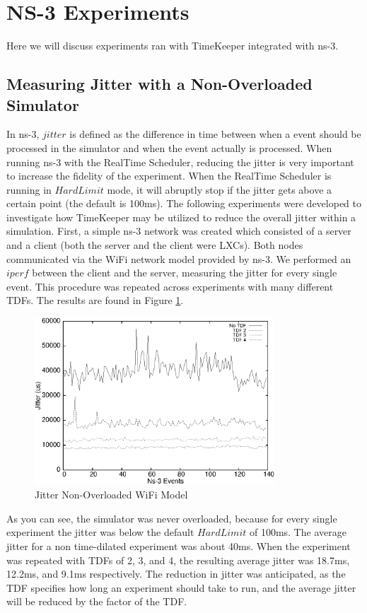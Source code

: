 \section{NS-3 Experiments}
\label {sec:ns3_experiments}
Here we will discuss experiments ran with TimeKeeper integrated with ns-3. 
\subsection{Measuring Jitter with a Non-Overloaded Simulator}
In ns-3, $jitter$ is defined as the difference in time between when a event should be processed in the simulator and when the event actually is processed. When running ns-3 with the RealTime Scheduler, reducing the jitter is very important to increase the fidelity of the experiment. When the RealTime Scheduler is running in $Hard Limit$ mode, it will abruptly stop if the jitter gets above a certain point (the default is 100ms). The following experiments were developed to investigate how TimeKeeper may be utilized to reduce the overall jitter within a simulation. First, a simple ns-3 network was created which consisted of a server and a client (both the server and the client were LXCs). Both nodes communicated via the WiFi network model provided by ns-3. We performed an $iperf$ between the client and the server, measuring the jitter for every single event. This procedure was repeated across experiments with many different TDFs. The results are found in Figure \ref{fig:nonoverloaded}.
\begin{figure} \centering  
      \includegraphics[width=0.8\textwidth]{images/jitter_nonoverloaded.eps} 
    \caption{Jitter Non-Overloaded WiFi Model} 
    \label{fig:nonoverloaded} 
  \end{figure}  
As you can see, the simulator was never overloaded, because for every single experiment the jitter was below the default $HardLimit$ of 100ms. The average jitter for a non time-dilated experiment was about 40ms. When the experiment was repeated with TDFs of 2, 3, and 4, the resulting average jitter was 18.7ms, 12.2ms, and 9.1ms respectively. The reduction in jitter was anticipated, as the TDF specifies how long an experiment should take to run, and the average jitter will be reduced by the factor of the TDF. \\
